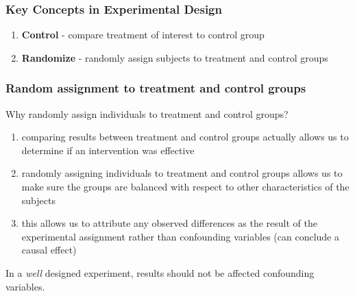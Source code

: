 %
\begin{frame}
\frametitle{Key Concepts in Experimental Design}
\begin{enumerate}
    \item
    \textbf{Control} - compare treatment of interest to control group
    \item
    \textbf{Randomize} - randomly assign subjects to treatment and control groups
\end{enumerate}
\end{frame}

\begin{frame}
\frametitle{Random assignment to treatment and control groups}
Why randomly assign individuals to treatment and control groups?
\begin{enumerate}
    \item
    comparing results between treatment and control groups actually allows us to determine if an intervention was effective
    \item
    randomly assigning individuals to treatment and control groups allows us to make sure the groups are balanced with respect to other characteristics of the subjects
    \item
    this allows us to attribute any observed differences as the result of the experimental assignment rather than confounding variables (can conclude a causal effect)
\end{enumerate}
\vskip15pt
In a \emph{well} designed experiment, results should not be affected confounding variables.
\end{frame}


